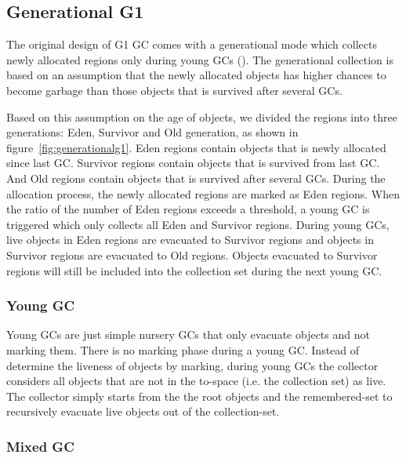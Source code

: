 \subsection{Generational G1}

The original design of G1 GC comes with a generational mode which collects newly allocated regions only during young GCs (\cite{detlefs2004garbage}).
The generational collection is based on an assumption that the newly allocated objects
has higher chances to become garbage than those objects that is survived after several GCs.

Based on this assumption on the age of objects, we divided the regions into three generations: Eden, Survivor and Old generation,
as shown in figure~\ref{fig:generationalg1}.
Eden regions contain objects that is newly allocated since last GC.
Survivor regions contain objects that is survived from last GC.
And Old regions contain objects that is survived after several GCs.
During the allocation process, the newly allocated regions are marked as Eden regions.
When the ratio of the number of Eden regions exceeds a  threshold,
a young GC is triggered which only collects all Eden and Survivor regions.
During young GCs, live objects in Eden regions are evacuated to Survivor regions
and objects in Survivor regions are evacuated to Old regions.
Objects evacuated to Survivor regions will still be included into the collection set during the next young GC.

\begin{figure*}
  \centering
  \texttt{[image: \{figs/generational.png]}}
  \caption{Generational G1 Heap Allocation}
  \label{fig:generationalg1}
\end{figure*}

\subsubsection{Young GC}

Young GCs are just simple nursery GCs that only evacuate objects and not marking them.
There is no marking phase during a young GC. Instead of determine the liveness of objects
by marking, during young GCs the collector considers all objects that are not in the
to-space (i.e. the collection set) as live. The collector simply starts from the the root
objects and the remembered-set to recursively evacuate live objects out of the collection-set.

\subsubsection{Mixed GC}

